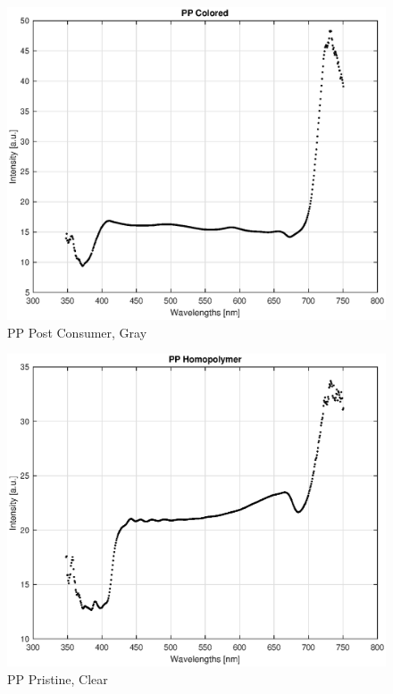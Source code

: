 \begin{appendices}
\begin{figure}
    \centering
    \includegraphics[width = 12cm]{Images/appendix/pp-postconsum-gray.eps}
    \caption[$\; \:$PP Post Consumer]{PP Post Consumer, Gray}
    \label{fig:pp-gray}
\end{figure}

\begin{figure}
    \centering
    \includegraphics[width = 12cm]{Images/appendix/pp-pristine-clear.eps}
    \caption[$\; \:$PP Pristine]{PP Pristine, Clear}
    \label{fig:pp-clear}
\end{figure}


\end{appendices}
